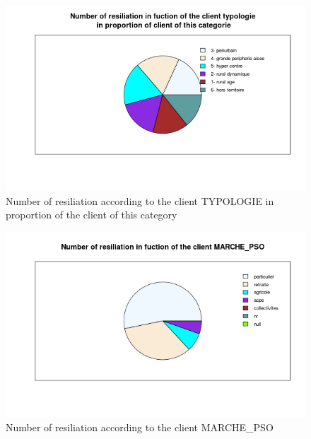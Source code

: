 \documentclass[a4paper, 11pt]{article}
\begin{document}
    \begin{figure}[!ht]
    	\centering
            \includegraphics[height = 10 cm]{Valentin/Number_of_resiliation_in_fuction_of_the_client_typologie_proportion.png}
            \caption{Number of resiliation according to the client TYPOLOGIE in proportion of the client of this category}
            \label{fig:resiliation_typo2}
    \end{figure}
    
            \begin{figure}[!ht]
    	\centering
            \includegraphics[height = 10 cm]{Valentin/Number_of_resiliation_in_fuction_of_the_client_MARCHE_PSO.png}
            \caption{Number of resiliation according to the client MARCHE\_PSO}
            \label{fig:resiliation_pso1}
    \end{figure}
    
\end{document}
